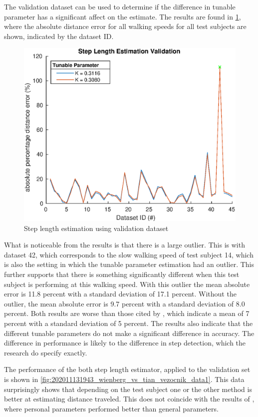 The validation dataset can be used to determine if the difference in tunable parameter has a significant affect on the estimate. The results are found in  \cref{fig:step_length_estimation_validation}, where the absolute distance error for all walking speeds for all test subjects are shown, indicated by the dataset ID.
\begin{figure}[H]
	\centering
	\includegraphics[width=0.7\linewidth]{images/20201028_1344_Step_Length_Estimation_Validation}
	\setlength{\belowcaptionskip}{-20pt}
	\caption{Step length estimation using validation dataset}
	\label{fig:step_length_estimation_validation}
\end{figure}

What is noticeable from the results is that there is a large outlier. This is with dataset 42, which corresponds to the slow walking speed of test subject 14, which is also the setting in which the tunable parameter estimation had an outlier. This further supports that there is something significantly different when this test subject is performing at this walking speed. With this outlier the mean absolute error is 11.8 percent with a standard deviation of 17.1 percent. Without the outlier, the mean absolute error is 9.7 percent with a standard deviation of 8.0 percent. Both results are worse than those cited by \cite{Vezocnik2019}, which indicate a mean of 7 percent with a standard deviation of 5 percent.
The results also indicate that the different tunable parameters do not make a significant difference in accuracy. The difference in performance is likely to the difference in step detection, which the research do specify exactly. \par

The performance of the both step length estimator, applied to the validation set is shown in  \cref{fig:202011131943_wienberg_vs_tian_vezocnik_data1}. This data surprisingly shows that depending on the test subject one or the other method is better at estimating distance traveled. This does not coincide with the results of \cite{Vezocnik2019}, where personal parameters performed better than general parameters.

